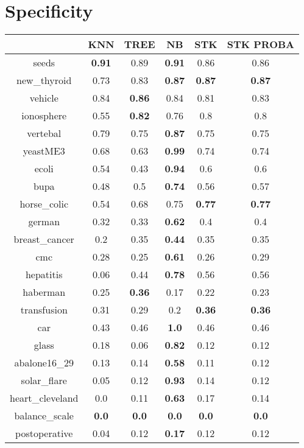 \documentclass{article}%
\begin{document}
\section*{Specificity}%
\begin{tabular}{c|ccccc}%
&KNN&TREE&NB&STK&STK PROBA\\%
\hline%
seeds&\textbf{0.91}&0.89&\textbf{0.91}&0.86&0.86\\%
new\_thyroid&0.73&0.83&\textbf{0.87}&\textbf{0.87}&\textbf{0.87}\\%
vehicle&0.84&\textbf{0.86}&0.84&0.81&0.83\\%
ionosphere&0.55&\textbf{0.82}&0.76&0.8&0.8\\%
vertebal&0.79&0.75&\textbf{0.87}&0.75&0.75\\%
yeastME3&0.68&0.63&\textbf{0.99}&0.74&0.74\\%
ecoli&0.54&0.43&\textbf{0.94}&0.6&0.6\\%
bupa&0.48&0.5&\textbf{0.74}&0.56&0.57\\%
horse\_colic&0.54&0.68&0.75&\textbf{0.77}&\textbf{0.77}\\%
german&0.32&0.33&\textbf{0.62}&0.4&0.4\\%
breast\_cancer&0.2&0.35&\textbf{0.44}&0.35&0.35\\%
cmc&0.28&0.25&\textbf{0.61}&0.26&0.29\\%
hepatitis&0.06&0.44&\textbf{0.78}&0.56&0.56\\%
haberman&0.25&\textbf{0.36}&0.17&0.22&0.23\\%
transfusion&0.31&0.29&0.2&\textbf{0.36}&\textbf{0.36}\\%
car&0.43&0.46&\textbf{1.0}&0.46&0.46\\%
glass&0.18&0.06&\textbf{0.82}&0.12&0.12\\%
abalone16\_29&0.13&0.14&\textbf{0.58}&0.11&0.12\\%
solar\_flare&0.05&0.12&\textbf{0.93}&0.14&0.12\\%
heart\_cleveland&0.0&0.11&\textbf{0.63}&0.17&0.14\\%
balance\_scale&\textbf{0.0}&\textbf{0.0}&\textbf{0.0}&\textbf{0.0}&\textbf{0.0}\\%
postoperative&0.04&0.12&\textbf{0.17}&0.12&0.12\\%
\end{tabular}

%
\end{document}
